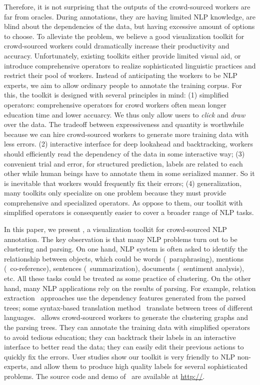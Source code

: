 Therefore, it is not surprising that the outputs of the crowd-sourced workers are far from oracles. During annotations, they are having limited NLP knowledge, are blind about the dependencies of the data, but having excessive amount of options to choose. To alleviate the problem, we believe a good visualization toolkit for crowd-sourced workers could dramatically increase their productivity and accuracy. Unfortunately, existing toolkits either provide limited visual aid, or introduce comprehensive operators to realize sophisticated linguistic practices and restrict their pool of workers. Instead of anticipating the workers to be NLP experts, we aim to allow ordinary people to annotate the training corpus. For this, the toolkit is designed with several principles in mind: (1) simplified operators: comprehensive operators for crowd workers often mean longer education time and lower accuarcy. We thus only allow users to {\em click} and {\em draw} over the data. The tradeoff between expressiveness and quantity is worthwhile because we can hire crowd-sourced workers to generate more training data with less errors. (2) interactive interface for deep lookahead and backtracking, workers should efficiently read the dependency of the data in some interactive way; (3) convenient trial and error, for structured prediction, labels are related to each other while human beings have to annotate them in some serialized manner. So it is inevitable that workers would frequently fix their errors; (4) generalization, many toolkits only specialize on one problem because they must provide comprehensive and specialized operators. As oppose to them, our toolkit with simplified operators is consequently easier to cover a broader range of NLP tasks.

In this paper, we present \sys, a visualization toolkit for crowd-sourced NLP annotation. The key observation is that many NLP problems turn out to be clustering and parsing. On one hand, NLP system is often asked to identify the relationship between objects, which could be words (\eg\ paraphrasing), mentions (\eg\ co-reference), sentences (\eg\ summarization), documents (\eg\ sentiment analysis), etc. All these tasks could be treated as some practice of clustering. On the other hand, many NLP applications rely on the results of parsing. For example, relation extraction~\cite{hoffmann2011knowledge} approaches use the dependency features generated from the parsed trees; some syntax-based translation method~\cite{chiang2010learning} translate between trees of different languages. \sys\ allows crowd-sourced workers to generate the clustering graphs and the parsing trees. They can annotate the training data with simplified operators to avoid tedious education; they can backtrack their labels in an interactive interface to better read the data; they can easily edit their previous actions to quickly fix the errors. User studies show our toolkit is very friendly to NLP non-experts, and allow them to produce high quality labels for several sophisticated problems.  The source code and demo of \sys\ are available at \url{http://}.


